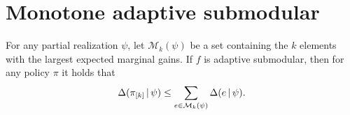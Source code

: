 \section{Monotone adaptive submodular}


\begin{lemma}
  For any partial realization $\psi$, let $\mathcal{M}_k(\psi)$ be a set containing the $k$ elements with the largest expected marginal gains.
  If $f$ is adaptive submodular, then for any policy $\pi$ it holds that
  \begin{align*}
    \Delta(\pi_{[k]}\,\vert\,\psi) \leq \sum_{e \in \mathcal{M}_k(\psi)} \Delta(e\,\vert\,\psi).
  \end{align*}
\end{lemma}
